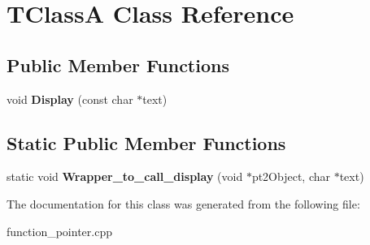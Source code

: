\hypertarget{classTClassA}{}\section{T\+ClassA Class Reference}
\label{classTClassA}
\subsection*{Public Member Functions}
\begin{DoxyCompactItemize}
\item 
void {\bfseries Display} (const char $\ast$text)\hypertarget{classTClassA_a2eaf8f3b32acab38d6b5325e29b694bf}{}\label{classTClassA_a2eaf8f3b32acab38d6b5325e29b694bf}

\end{DoxyCompactItemize}
\subsection*{Static Public Member Functions}
\begin{DoxyCompactItemize}
\item 
static void {\bfseries Wrapper\+\_\+to\+\_\+call\+\_\+display} (void $\ast$pt2\+Object, char $\ast$text)\hypertarget{classTClassA_aa8b0431f67b51f322d9847e32f5ac434}{}\label{classTClassA_aa8b0431f67b51f322d9847e32f5ac434}

\end{DoxyCompactItemize}


The documentation for this class was generated from the following file\+:\begin{DoxyCompactItemize}
\item 
function\+\_\+pointer.\+cpp\end{DoxyCompactItemize}

